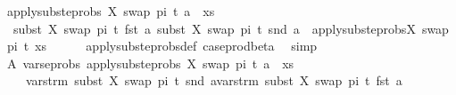 \begin{isabellebody}
\ {\isachardoublequoteopen}apply{\isacharunderscore}{\kern0pt}subst{\isacharunderscore}{\kern0pt}eprobs\ {\isacharbrackleft}{\kern0pt}{\isacharparenleft}{\kern0pt}X{\isacharcomma}{\kern0pt}\ swap\ pi\ t{\isacharparenright}{\kern0pt}{\isacharbrackright}{\kern0pt}\ {\isacharparenleft}{\kern0pt}a\ {\isacharhash}{\kern0pt}\ xs{\isacharparenright}{\kern0pt}\ {\isacharequal}{\kern0pt}\ \isanewline
\ \ {\isacharparenleft}{\kern0pt}subst\ {\isacharbrackleft}{\kern0pt}{\isacharparenleft}{\kern0pt}X{\isacharcomma}{\kern0pt}\ swap\ pi\ t{\isacharparenright}{\kern0pt}{\isacharbrackright}{\kern0pt}\ {\isacharparenleft}{\kern0pt}fst\ a{\isacharparenright}{\kern0pt}{\isacharcomma}{\kern0pt}\ subst\ {\isacharbrackleft}{\kern0pt}{\isacharparenleft}{\kern0pt}X{\isacharcomma}{\kern0pt}\ swap\ pi\ t{\isacharparenright}{\kern0pt}{\isacharbrackright}{\kern0pt}\ {\isacharparenleft}{\kern0pt}snd\ a{\isacharparenright}{\kern0pt}{\isacharparenright}{\kern0pt}\ {\isacharhash}{\kern0pt}\ {\isacharparenleft}{\kern0pt}apply{\isacharunderscore}{\kern0pt}subst{\isacharunderscore}{\kern0pt}eprobs{\isacharbrackleft}{\kern0pt}{\isacharparenleft}{\kern0pt}X{\isacharcomma}{\kern0pt}\ swap\ pi\ t{\isacharparenright}{\kern0pt}{\isacharbrackright}{\kern0pt}\ xs{\isacharparenright}{\kern0pt}{\isachardoublequoteclose}\isanewline
\ \ \ \ \isamarkupfalse%
\ apply{\isacharunderscore}{\kern0pt}subst{\isacharunderscore}{\kern0pt}eprobs{\isacharunderscore}{\kern0pt}def\ case{\isacharunderscore}{\kern0pt}prod{\isacharunderscore}{\kern0pt}beta\ \isamarkupfalse%
\ simp\isanewline
\ \ \isamarkupfalse%
\ A{\isacharcolon}{\kern0pt}\ {\isachardoublequoteopen}vars{\isacharunderscore}{\kern0pt}eprobs\ {\isacharparenleft}{\kern0pt}apply{\isacharunderscore}{\kern0pt}subst{\isacharunderscore}{\kern0pt}eprobs\ {\isacharbrackleft}{\kern0pt}{\isacharparenleft}{\kern0pt}X{\isacharcomma}{\kern0pt}\ swap\ pi\ t{\isacharparenright}{\kern0pt}{\isacharbrackright}{\kern0pt}\ {\isacharparenleft}{\kern0pt}a\ {\isacharhash}{\kern0pt}\ xs{\isacharparenright}{\kern0pt}{\isacharparenright}{\kern0pt}\ {\isacharequal}{\kern0pt}\ \isanewline
\ \ \ \ {\isacharparenleft}{\kern0pt}vars{\isacharunderscore}{\kern0pt}trm\ {\isacharparenleft}{\kern0pt}subst\ {\isacharbrackleft}{\kern0pt}{\isacharparenleft}{\kern0pt}X{\isacharcomma}{\kern0pt}\ swap\ pi\ t{\isacharparenright}{\kern0pt}{\isacharbrackright}{\kern0pt}\ {\isacharparenleft}{\kern0pt}snd\ a{\isacharparenright}{\kern0pt}{\isacharparenright}{\kern0pt}{\isacharparenright}{\kern0pt}{\isasymunion}{\isacharparenleft}{\kern0pt}vars{\isacharunderscore}{\kern0pt}trm\ {\isacharparenleft}{\kern0pt}subst\ {\isacharbrackleft}{\kern0pt}{\isacharparenleft}{\kern0pt}X{\isacharcomma}{\kern0pt}\ swap\ pi\ t{\isacharparenright}{\kern0pt}{\isacharbrackright}{\kern0pt}\ {\isacharparenleft}{\kern0pt}fst\ a{\isacharparenright}{\kern0pt}{\isacharparenright}{\kern0pt}{\isacharparenright}{\kern0pt}\isanewline

\end{isabellebody}
